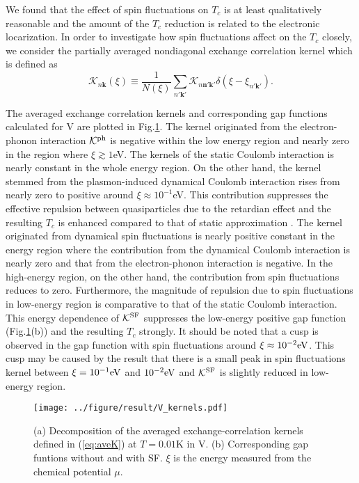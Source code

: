 We found that the effect of spin fluctuations on $T_c$ is at least qualitatively reasonable and 
the amount of the $T_c$ reduction is related to the electronic locarization.
In order to investigate how spin fluctuations affect on the $T_c$ closely, we 
consider the partially averaged nondiagonal exchange correlation kernel which is defined as
%
\begin{equation}
	\mathcal K_{n\bm k}(\xi) \equiv \frac{1}{N(\xi)}
	\sum_{n'\bm k'} \mathcal K_{n\bm n'\bm k'}\delta(\xi - \xi_{n'\bm k'}).
	\label{eq:aveK}
\end{equation}
%

The averaged exchange correlation kernels and corresponding gap functions calculated for V 
are plotted in Fig.\ref{fig:Vaveker}. The kernel originated from the electron-phonon interaction
$\mathcal K^{\rm ph}$ is negative within the low energy region and nearly zero in the region 
where $\xi \gtrsim 1$eV. The kernels of the static Coulomb interaction is nearly constant in the
whole energy region. On the other hand, the kernel stemmed from the plasmon-induced dynamical
Coulomb interaction rises from nearly zero to positive around $\xi \approx 10^{-1}$eV.
This contribution suppresses the effective repulsion between quasiparticles due to the 
retardian effect and the resulting $T_c$ is enhanced compared to that of static approximation
\cite{RA2013}.
The kernel originated from dynamical spin fluctuations is nearly positive constant in the energy region where
the contribution from the dynamical Coulomb interaction is nearly zero and that from the
electron-phonon interaction is negative. In the high-energy region, on the other hand, 
the contribution from spin fluctuations reduces to zero. 
Furthermore, the magnitude of repulsion due to spin fluctuations in low-energy region is comparative 
to that of the static Coulomb interaction. This energy dependence of
$\mathcal K^{\rm SF}$ suppresses the low-energy positive gap function (Fig.\ref{fig:Vaveker}(b)) and
the resulting $T_c$ strongly.
It should be noted that a cusp is observed in the gap function with spin fluctuations 
around $\xi \approx 10^{-2}{\rm eV}$. This cusp may be caused by the result that there is a small
peak in spin fluctuations kernel between $\xi = 10^{-1}{\rm eV}$ and $10^{-2}{\rm eV}$ and
$\mathcal K^{\rm SF}$ is slightly reduced in low-energy region.

%
\begin{figure}[h]
	\centering
	\texttt{[image: ../figure/result/V\_kernels.pdf]}
	\caption{(a) Decomposition of the averaged exchange-correlation kernels defined in 
		(\ref{eq:aveK}) at $T=0.01$K in V. (b) Corresponding gap funtions without 
	and with SF. $\xi$ is the energy measured from the chemical potential $\mu$.}
	\label{fig:Vaveker}
\end{figure}
%

